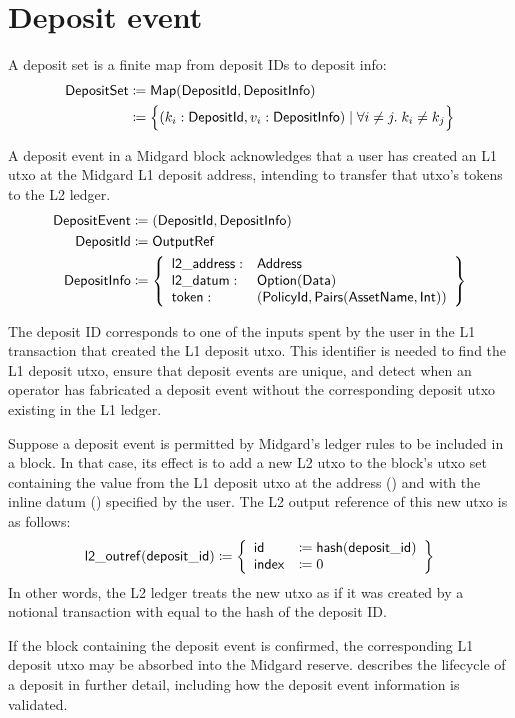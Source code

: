 \documentclass[../midgard.tex]{subfiles}
\begin{document}
\section{Deposit event}
\label{h:deposit-event}

A deposit set is a finite map from deposit IDs to deposit info:
\begin{align*}
    \mathsf{DepositSet} &\coloneq \mathsf{Map(DepositId, DepositInfo)} \\
      &\coloneq \Bigl\{
        (k_i: \mathsf{DepositId}, v_i: \mathsf{DepositInfo}) \mid \forall i \neq j.\; k_i \neq k_j
    \Bigr\}
\end{align*}

A deposit event in a Midgard block acknowledges that a user has created an L1 utxo at the Midgard L1 deposit address, intending to transfer that utxo's tokens to the L2 ledger.
\begin{align*}
    \mathsf{DepositEvent} &\coloneq (\mathsf{DepositId}, \mathsf{DepositInfo}) \\
    \mathsf{DepositId} &\coloneq \mathsf{OutputRef} \\
    \mathsf{DepositInfo} &\coloneq \left\{
        \begin{array}{ll}
            \mathsf{l2\_address} : & \mathsf{Address} \\
            \mathsf{l2\_datum} : & \mathsf{Option(Data)} \\
            \mathsf{token} : & \mathsf{(PolicyId, Pairs(AssetName, Int))}
        \end{array} \right\}
\end{align*}

The deposit ID corresponds to one of the inputs spent by the user in the L1 transaction that created the L1 deposit utxo.
This identifier is needed to find the L1 deposit utxo, ensure that deposit events are unique, and detect when an operator has fabricated a deposit event without the corresponding deposit utxo existing in the L1 ledger.

Suppose a deposit event is permitted by Midgard's ledger rules to be included in a block.
In that case, its effect is to add a new L2 utxo to the block's utxo set containing the value from the L1 deposit utxo at the address () and with the inline datum () specified by the user.
The L2 output reference of this new utxo is as follows: 
\begin{equation*}
    \mathsf{l2\_outref(deposit\_id)} \coloneq \left\{
    \begin{array}{ll}
        \mathsf{id} &\coloneq \mathsf{hash(deposit\_id)} \\
        \mathsf{index} &\coloneq 0
    \end{array} \right\}
\end{equation*}
In other words, the L2 ledger treats the new utxo as if it was created by a notional transaction with  equal to the hash of the deposit ID.

If the block containing the deposit event is confirmed, the corresponding L1 deposit utxo may be absorbed into the Midgard reserve.
 describes the lifecycle of a deposit in further detail, including how the deposit event information is validated.
\end{document}
